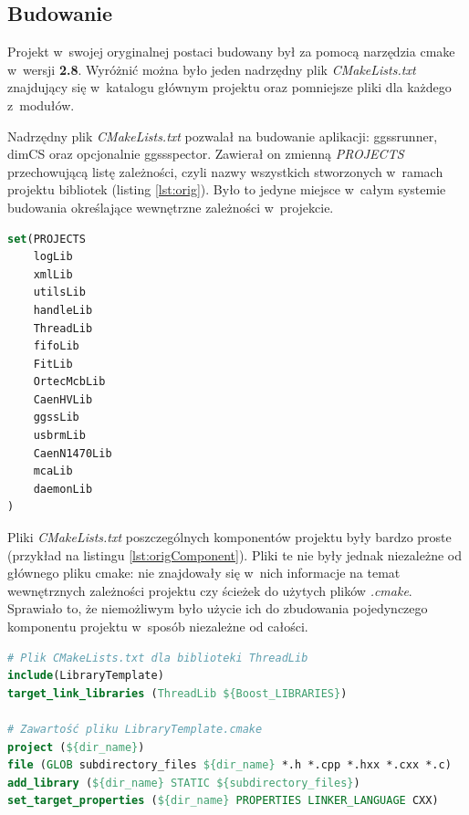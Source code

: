 \subsection{Budowanie} 
Projekt w~swojej oryginalnej postaci budowany był za pomocą narzędzia \gls*{cmake} w~wersji \textbf{2.8}. Wyróżnić można było jeden nadrzędny plik \textit{CMakeLists.txt} znajdujący się w~katalogu głównym projektu oraz pomniejsze pliki dla każdego z~modułów.

Nadrzędny plik \textit{CMakeLists.txt} pozwalał na budowanie aplikacji: ggssrunner, dimCS oraz opcjonalnie ggssspector. Zawierał on zmienną \textit{PROJECTS} przechowującą listę zależności, czyli nazwy wszystkich stworzonych w~ramach projektu bibliotek (listing \ref{lst:orig}). Było to jedyne miejsce w~całym systemie budowania określające wewnętrzne zależności w~projekcie.

\begin{lstlisting}[language=cmake, caption={Fragment oryginalnego pliku \textit{CMakeLists.txt} znajdującego się w~katalogu głównym pierwotnej wersji projektu przedstawiający zmienną \textit{PROJECTS} zawierającą listę bibliotek \cite{PluteckiMgr}}, label={lst:orig}]
set(PROJECTS
    logLib
    xmlLib
    utilsLib
    handleLib
    ThreadLib
    fifoLib
    FitLib
    OrtecMcbLib
    CaenHVLib
    ggssLib
    usbrmLib
    CaenN1470Lib
    mcaLib
    daemonLib
)
\end{lstlisting}

Pliki \textit{CMakeLists.txt} poszczególnych komponentów projektu były bardzo proste (przykład na listingu \ref{lst:origComponent}). Pliki te nie były jednak niezależne od głównego pliku \gls*{cmake}: nie znajdowały się w~nich informacje na temat wewnętrznych zależności projektu czy ścieżek do użytych plików \textit{.cmake}. Sprawiało to, że niemożliwym było użycie ich do zbudowania pojedynczego komponentu projektu w~sposób niezależne od całości. 

\begin{lstlisting}[language=cmake, caption={Oryginalny pliku \textit{CMakeLists.txt} służący do budowania biblioteki \textit{ThreadLib} oraz zawartość pliku \textit{LibraryTemplate.cmake} \cite{PluteckiMgr}}, label={lst:origComponent}]
# Plik CMakeLists.txt dla biblioteki ThreadLib
include(LibraryTemplate)
target_link_libraries (ThreadLib ${Boost_LIBRARIES})

# Zawartość pliku LibraryTemplate.cmake
project (${dir_name})
file (GLOB subdirectory_files ${dir_name} *.h *.cpp *.hxx *.cxx *.c)
add_library (${dir_name} STATIC ${subdirectory_files})
set_target_properties (${dir_name} PROPERTIES LINKER_LANGUAGE CXX)
\end{lstlisting}

